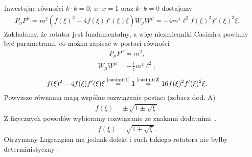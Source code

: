 Inwestując równości $k\cdot k=0$, $\dot{x}\cdot\dot{x}=1$ 
oraz $\dot{k} \cdot k= 0$ dostajemy
\begin{align*}
P_\mu P^\mu =  m^2( f(\xi)^2- 4 f(\xi) f'(\xi) \xi)
W_\mu W^\mu = 
 - 4 m^4\ell^2  f(\xi)^2 f'(\xi)^2 \xi .
\end{align*}
Zakładamy, że rotator jest fundamentalny, a więc niezmienniki
Casimira powinny być parametrami, co można zapisać w postaci
równości
\begin{align} \label{casimir1}
P_\mu P^\mu = m^2, \tag{C1}
\end{align}
\begin{align} \label{casimir2}
W_\mu W^\mu = - \frac{1}{4} m^4 \ell^2 , \tag{C2}
\end{align}
\begin{align*} 
 f(\xi)^2- 4 f(\xi) f'(\xi) \xi
\stackrel{\text{\ref{casimir1}}}{=} 
1 \stackrel{\text{\ref{casimir2}}}{=}
  16   f(\xi)^2 f'(\xi)^2 \xi .
\end{align*}
Powyższe równania mają wspólne rozwiązanie 
postaci (zobacz dod. A)
\begin{align*}
f(\xi ) = \pm \sqrt{ 1 \pm \sqrt{\xi} }.
\end{align*}
Z fizycznych powodów wybieramy rozwiązanie ze znakami
dodatnimi~\cite{Bratek2009nonuniq}.
\begin{align*}
f(\xi ) =  \sqrt{ 1 + \sqrt{\xi} }.
\end{align*}
Otrzymany Lagrangian ma jednak defekt i ruch takiego 
rotatora nie byłby deterministyczny~\cite{Bratek2012Spinorindeterm}.


